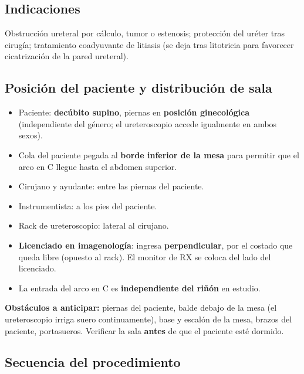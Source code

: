 {\subsection*{Indicaciones}
Obstrucción ureteral por cálculo, tumor o estenosis; protección del uréter tras cirugía; tratamiento coadyuvante de litiasis (se deja tras litotricia para favorecer cicatrización de la pared ureteral).

\subsection*{Posición del paciente y distribución de sala}

\begin{itemize}[noitemsep]
  \item Paciente: \textbf{decúbito supino}, piernas en \textbf{posición ginecológica} (independiente del género; el ureteroscopio accede igualmente en ambos sexos).
  \item Cola del paciente pegada al \textbf{borde inferior de la mesa} para permitir que el arco en C llegue hasta el abdomen superior.
  \item Cirujano y ayudante: entre las piernas del paciente.
  \item Instrumentista: a los pies del paciente.
  \item Rack de ureteroscopio: lateral al cirujano.
  \item \textbf{Licenciado en imagenología}: ingresa \textbf{perpendicular}, por el costado que queda libre (opuesto al rack). El monitor de RX se coloca del lado del licenciado.
  \item La entrada del arco en C es \textbf{independiente del riñón} en estudio.\\
\end{itemize}

\begin{cajariesgo}
\textbf{Obstáculos a anticipar:} piernas del paciente, balde debajo de la mesa (el ureteroscopio irriga suero continuamente), base y escalón de la mesa, brazos del paciente, portasueros. Verificar la sala \textbf{antes} de que el paciente esté dormido.
\end{cajariesgo}

\subsection*{Secuencia del procedimiento}

}
